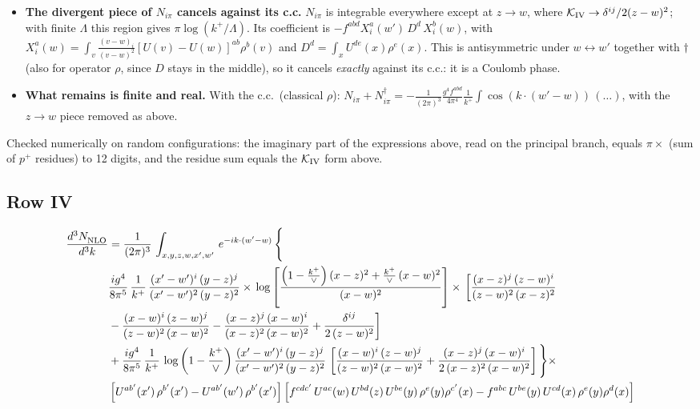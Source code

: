 \documentclass[9pt]{article}
\numberwithin{equation}{section}
\begin{document}
{\begin{itemize}
\item \textbf{The divergent piece of $N_{i\pi}$ cancels against its c.c.} $N_{i\pi}$ is integrable everywhere except at $z\to w$, where $\mathcal K_{\rm IV}\to\delta^{ij}/2(z-w)^{2}$; with finite $\Lambda$ this region gives $\pi\log(k^{+}/\Lambda)$. Its coefficient is
$-f^{abd}X^{a}_{i}(w')\,D^{d}\,X^{b}_{i}(w)$, with $X^{a}_{i}(w)=\int_{v}\frac{(v-w)_{i}}{(v-w)^{2}}[U(v)-U(w)]^{ab}\rho^{b}(v)$ and $D^{d}=\int_{x}U^{de}(x)\rho^{e}(x)$. This is antisymmetric under $w\leftrightarrow w'$ together with $\dagger$ (also for operator $\rho$, since $D$ stays in the middle), so it cancels \emph{exactly} against its c.c.: it is a Coulomb phase.
\item \textbf{What remains is finite and real.} With the c.c.\ (classical $\rho$): $N_{i\pi}+N_{i\pi}^{\dagger}=-\frac{1}{(2\pi)^{3}}\frac{g^{4}f^{abd}}{4\pi^{4}}\frac{1}{k^{+}}\int\cos(k\cdot(w'-w))\,(\dots)$, with the $z\to w$ piece removed as above.
\end{itemize}
Checked numerically on random configurations: the imaginary part of the expressions above, read on the principal branch, equals $\pi\times$ (sum of $p^{+}$ residues) to 12 digits, and the residue sum equals the $\mathcal K_{\rm IV}$ form above.}
\subsection{Row IV}
\begin{align}
    \frac{d^{3}N_{\rm NLO}^{\rm}}{d^{3}k}  & =   \frac{1}{(2\pi)^{3}}\,
    \int_{x,y,z,w,x',w'}\,e^{-ik\cdot (w^\prime-w)}\,\Bigg\{\notag \\
& \frac{ig^{4}}{8\pi^{5}}\,\frac{1}{k^{+}}\,\frac{(x'-w')^{i}\,(y-z)^{j}}{(x'-w')^{2}\,(y-z)^{2}}\times\,\log{\left[\frac{\left(1-\frac{k^{+}}{\vee}\right)(x-z)^{2}+\frac{k^{+}}{\vee}\,(x-w)^{2}}{(x-w)^{2}}\right]}\times\, \bigg[\frac{(x-z)^{j}\,(z-w)^{i}}{(z-w)^{2}\,(x-z)^{2}}\notag \\ & -\frac{(x-w)^{i}\,(z-w)^{j}}{(z-w)^{2}\,(x-w)^{2}}-\frac{(x-z)^{j}\,(x-w)^{i}}{(x-z)^{2}\,(x-w)^{2}}+\frac{\delta^{ij}}{2\,(z-w)^{2}}\bigg] \notag \\
& + \frac{ig^{4}}{8\pi^{5}}\,\frac{1}{k^{+}}\,\log{\left(1-\frac{k^{+}}{\vee}\right)}\,\frac{(x'-w')^{i}\,(y-z)^{j}}{(x'-w')^{2}\,(y-z)^{2}}\,\left[\frac{(x-w)^{i}\,(z-w)^{j}}{(z-w)^{2}\,(x-w)^{2}}+\frac{(x-z)^{j}\,(x-w)^{i}}{2\, (x-z)^{2}\,(x-w)^{2}}\right]\Bigg\}\times\notag \\ &  \left[U^{ab'}(x')\,\rho^{b'}(x')-U^{ab'}(w')\,\rho^{b'}(x')\right] \left[f^{cdc'}\,U^{ac}(w)\,U^{bd}(z)\,U^{be}(y)\,\rho^{e}(y)\rho^{c'}(x)-f^{abc}\,U^{be}(y)\,U^{cd}(x)\,\rho^{e}(y)\rho^{d}(x)\right]
\end{align}
\end{document}
